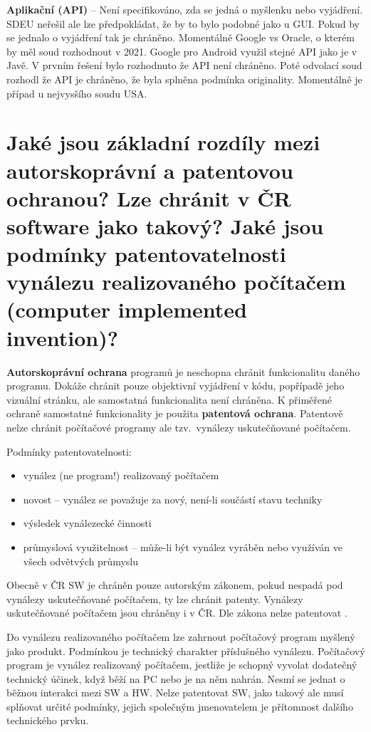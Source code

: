 \textbf{Aplikační (API)} -- Není specifikováno, zda se jedná o myšlenku nebo vyjádření. SDEU neřešil ale lze předpokládat, že by to bylo podobné jako u GUI\@. Pokud by se jednalo o vyjádření tak je chráněno. Momentálně Google vs Oracle, o kterém by měl soud rozhodnout v 2021. Google pro Android využil stejné API jako je v Javě. V prvním řešení bylo rozhodnuto že API není chráněno. Poté odvolací soud rozhodl že API je chráněno, že byla splněna podmínka originality. Momentálně je případ u nejvysšího soudu USA\@.


\section{Jaké jsou základní rozdíly mezi autorskoprávní a patentovou ochranou? Lze chránit v ČR software jako takový? Jaké jsou podmínky patentovatelnosti vynálezu realizovaného počítačem (computer implemented invention)?}

\textbf{Autorskoprávní ochrana} programů je neschopna chránit funkcionalitu daného programu. Dokáže chránit pouze objektivní vyjádření v kódu, popřípadě jeho vizuální stránku, ale samostatná funkcionalita není chráněna. K přiměřené ochraně samostatné funkcionality je použita \textbf{patentová ochrana}. Patentově nelze chránit počítačové programy ale tzv.\ vynálezy uskutečňované počítačem.
\newline

\noindent Podmínky patentovatelnosti:
\begin{itemize}[noitemsep]
    \item vynález (ne program!) realizovaný počítačem
    \item novost -- vynález se považuje za nový, není-li součástí stavu techniky
    \item výsledek vynálezecké činnosti
    \item průmyslová využitelnost -- může-li být vynález vyráběn nebo využíván ve všech odvětvých průmyslu
\end{itemize}
Obecně v ČR SW je chráněn pouze autorským zákonem, pokud nespadá pod vynálezy uskutečňované počítačem, ty lze chránit patenty.  
Vynálezy uskutečňované počítačem jsou chráněny i v ČR. Dle zákona nelze patentovat .

Do vynálezu realizovaného počítačem lze zahrnout počítačový program myšlený jako produkt. Podmínkou je technický charakter příslušného vynálezu. Počítačový program je vynález realizovaný počítačem, jestliže je schopný vyvolat dodatečný technický účinek, když běží na PC nebo je na něm nahrán. Nesmí se jednat o běžnou interakci mezi SW a HW\@. Nelze patentovat SW, jako takový ale musí splňovat určité podmínky, jejich společným jmenovatelem je přítomnost dalšího technického prvku. 



